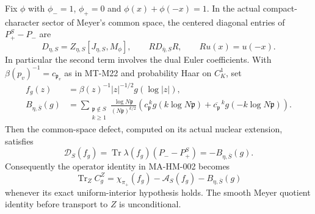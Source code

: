 Fix $\phi$ with $\phi_-=1$, $\phi_+=0$ and
$\phi(x)+\phi(-x)=1$.  In the actual compact-character sector
of Meyer's common space, the centered diagonal entries of
$P_+^S-P_-$ are
\[
 D_{\eta,S}=Z_{\eta,S}[J_{\eta,S},M_\phi],
 \qquad R D_{\bar\eta,S}R,
 \qquad Ru(x)=u(-x).
\tag{MA-CC.4}
\]
In particular the second term involves the dual Euler coefficients.
With $\beta(p_v)^{-1}=c_{\mathfrak p_v}$ as in MT-M22 and
probability Haar on $C_K^1$, set
\[
\begin{aligned}
 f_g(z)&=\beta(z)^{-1}|z|^{-1/2}g(\log|z|),\\
 B_{\eta,\overline S}(g)&=
 \sum_{\substack{\mathfrak p\notin S\\k\ge1}}
 \frac{\log N\mathfrak p}{(N\mathfrak p)^{k/2}}
 \left(c_{\mathfrak p}^{\,k}g(k\log N\mathfrak p)
 +\overline{c_{\mathfrak p}}^{\,k}g(-k\log N\mathfrak p)\right).
\end{aligned}
\tag{MA-CC.5}
\]
Then the common-space defect, computed on its actual nuclear
extension, satisfies
\[
 \mathcal D_S(f_g)
 =\operatorname{Tr}\lambda(f_g)(P_- -P_+^S)
 =-B_{\eta,\overline S}(g).
\tag{MA-CC.6}
\]
Consequently the operator identity in MA-HM-002 becomes
\[
 \operatorname{Tr}_{Z}C_g^Z
 =\chi_{\pi_+}(f_g)-\mathcal A_S(f_g)
                           -B_{\eta,\overline S}(g)
\tag{MA-CC.7}
\]
whenever its exact uniform-interior hypothesis holds.  The smooth
Meyer quotient identity before transport to $Z$ is unconditional.

